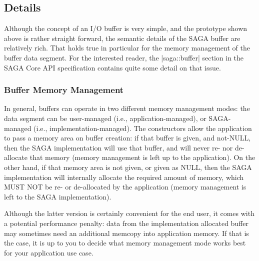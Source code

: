  \subsection{Details}
 
  Although the concept of an I/O buffer is very simple, and the
  prototype shown above is rather straight forward, the semantic
  details of the SAGA buffer are relatively rich.  That holds true in
  particular for the memory management of the buffer data segment.
  For the interested reader, the |saga::buffer| section in the SAGA
  Core API specification contains quite some detail on that issue.

  \subsubsection{Buffer Memory Management}

   In general, buffers can operate in two different memory
   management modes: the data segment can be user-managed (i.e.,
   application-managed), or SAGA-managed (i.e., implementation-managed).  The constructors allow the application to pass a memory
   area on buffer creation: if that buffer is given, and not-NULL,
   then the SAGA implementation will use that buffer, and will never
   re- nor de-allocate that memory (memory management is left up to
   the application).  On the other hand, if that memory area is not
   given, or given as NULL, then the SAGA implementation will
   internally allocate the required amount of memory, which MUST NOT
   be re- or de-allocated by the application (memory management is
   left to the SAGA implementation).

   Although the latter version is certainly convenient for the end
   user, it comes with a potential performance penalty:  data from the 
   implementation allocated buffer may sometimes need an additional
   memcopy into application memory.  If that is the case, it is up to you to decide what  memory management mode works best for your application use
   case.


